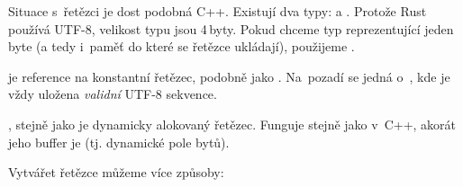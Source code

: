 \documentclass[main.tex]{subfiles}
\begin{document}

Situace s~řetězci je dost podobná C++. Existují dva typy:  a .
Protože Rust používá UTF-8, velikost typu  jsou 4\,byty. Pokud chceme typ
reprezentující jeden byte (a tedy i~paměť do které se řetězce ukládají), použijeme
.

 je reference na konstantní řetězec, podobně jako .
Na~pozadí se jedná o~\irust{&[u8]}, kde je vždy uložena \emph{validní} UTF-8 sekvence.

, stejně jako  je dynamicky alokovaný řetězec. Funguje
stejně jako v~C++, akorát jeho buffer je  (tj. dynamické pole bytů).

Vytvářet řetězce můžeme více způsoby:

\obrazek
{}



\end{document}
